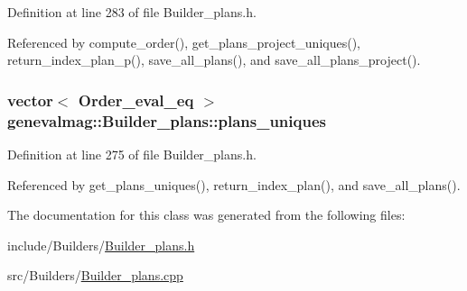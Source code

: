 Definition at line 283 of file Builder\_\-plans.h.



Referenced by compute\_\-order(), get\_\-plans\_\-project\_\-uniques(), return\_\-index\_\-plan\_\-p(), save\_\-all\_\-plans(), and save\_\-all\_\-plans\_\-project().

\hypertarget{classgenevalmag_1_1Builder__plans_a9cb3fc77b164a22cf37a0ec3e8f78bf7}{
\subsubsection[{plans\_\-uniques}]{\setlength{\rightskip}{0pt plus 5cm}vector$<$ {\bf Order\_\-eval\_\-eq} $>$ {\bf genevalmag::Builder\_\-plans::plans\_\-uniques}}}
\label{classgenevalmag_1_1Builder__plans_a9cb3fc77b164a22cf37a0ec3e8f78bf7}


Definition at line 275 of file Builder\_\-plans.h.



Referenced by get\_\-plans\_\-uniques(), return\_\-index\_\-plan(), and save\_\-all\_\-plans().



The documentation for this class was generated from the following files:\begin{DoxyCompactItemize}
\item 
include/Builders/\hyperlink{Builder__plans_8h}{Builder\_\-plans.h}\item 
src/Builders/\hyperlink{Builder__plans_8cpp}{Builder\_\-plans.cpp}\end{DoxyCompactItemize}
